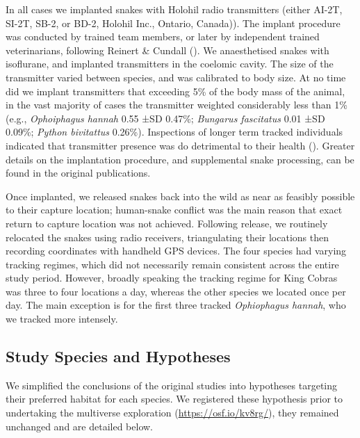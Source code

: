 \documentclass[10pt,a4paper]{article}
\begin{document}
In all cases we implanted snakes with Holohil radio transmitters (either AI-2T, SI-2T, SB-2, or BD-2, Holohil Inc., Ontario, Canada)).
The implant procedure was conducted by trained team members, or later by independent trained veterinarians, following Reinert \& Cundall ().
We anaesthetised snakes with isoflurane, and implanted transmitters in the coelomic cavity.
The size of the transmitter varied between species, and was calibrated to body size.
At no time did we implant transmitters that exceeding 5\% of the body mass of the animal, in the vast majority of cases the transmitter weighted considerably less than 1\% (e.g., \emph{Ophoiphagus hannah} 0.55 ±SD 0.47\%; \emph{Bungarus fascitatus} 0.01 ±SD 0.09\%; \emph{Python bivitattus} 0.26\%).
Inspections of longer term tracked individuals indicated that transmitter presence was do detrimental to their health ().
Greater details on the implantation procedure, and supplemental snake processing, can be found in the original publications.

Once implanted, we released snakes back into the wild as near as feasibly possible to their capture location; human-snake conflict was the main reason that exact return to capture location was not achieved.
Following release, we routinely relocated the snakes using radio receivers, triangulating their locations then recording coordinates with handheld GPS devices.
The four species had varying tracking regimes, which did not necessarily remain consistent across the entire study period.
However, broadly speaking the tracking regime for King Cobras was three to four locations a day, whereas the other species we located once per day.
The main exception is for the first three tracked \emph{Ophiophagus hannah}, who we tracked more intensely.

\subsection{Study Species and Hypotheses}\label{study-species-and-hypotheses}

We simplified the conclusions of the original studies into hypotheses targeting their preferred habitat for each species.
We registered these hypothesis prior to undertaking the multiverse exploration (\url{https://osf.io/kv8rg/}), they remained unchanged and are detailed below.
\end{document}
